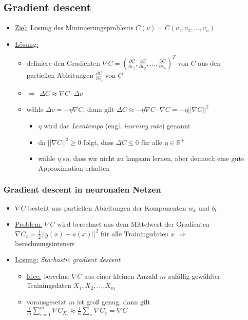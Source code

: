 \subsection{Gradient descent}

\begin{itemize}
  \item \underline{Ziel:} Lösung des Minimierungsproblems $C(v) = C(v_1, v_2, \ldots, v_n)$
  \item \underline{Lösung:}
  \begin{itemize}
    \item definiere den Gradienten $\nabla C  = {(\frac{\partial C}{\partial v_1}, \frac{\partial C}{\partial v_2}, \ldots, \frac{\partial C}{\partial v_n})}^T$ von $C$ aus den partiellen Ableitungen $\frac{\partial C}{\partial v_i}$ von $C$
    \item $\Rightarrow$ $\Delta C \approx \nabla  C \cdot \Delta v$
    \item wähle $\Delta v = - \eta \nabla C$, dann gilt $\Delta C \approx - \eta \nabla C \cdot \nabla C  = - \eta ||\nabla C||^2$ 
    \begin{itemize}
      \item $\eta$ wird das \emph{Lerntempo} (engl. \emph{learning rate}) genannt
      \item da $||\nabla C||^2 \geq 0$ folgt, dass $\Delta C \leq 0$ für alle $\eta \in \mathbb{R}^+$
      \item wähle $\eta$ so, dass wir nicht zu langsam lernen, aber dennoch eine gute Approximation erhalten
    \end{itemize}
  \end{itemize}
\end{itemize}

\subsubsection{Gradient descent in neuronalen Netzen}

\begin{itemize}
  \item $\nabla C$ besteht aus partiellen Ableitungen der Komponenten $w_k$ und $b_l$
  \item \underline{Problem:} $\nabla C$ wird berechnet aus dem Mittelwert der Gradienten $\nabla C_x = \frac{1}{2}||y(x)-a(x)||^2$ für alle Trainingsdaten $x$ $\Rightarrow$ berechnungsintensiv
  \item \underline{Lösung:} \emph{Stochastic gradient descent}
  \begin{itemize}
    \item \underline{Idee:} berechne $\nabla C$ aus einer kleinen Anzahl $m$ zufällig gewählter Trainingsdaten $X_1, X_2, \ldots, X_m$
    \item vorausgesetzt $m$ ist groß genug, dann gilt $\frac{1}{m} \sum_{i=1}^m \nabla C_{X_i} \approx \frac{1}{n} \sum_x \nabla C_x = \nabla C$
  \end{itemize}
\end{itemize}
